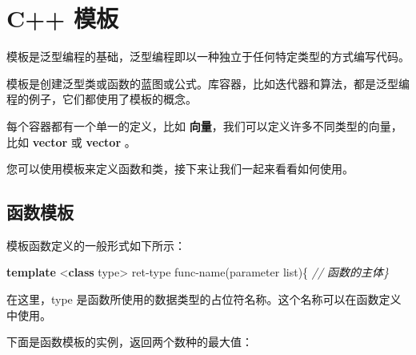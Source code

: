 \documentclass[
]{article}
\newenvironment{Shaded}{}{}
\newcommand{\CommentTok}[1]{\textcolor[rgb]{0.38,0.63,0.69}{\textit{#1}}}
\newcommand{\KeywordTok}[1]{\textcolor[rgb]{0.00,0.44,0.13}{\textbf{#1}}}
\newcommand{\NormalTok}[1]{#1}
\newcommand{\OperatorTok}[1]{\textcolor[rgb]{0.40,0.40,0.40}{#1}}
\begin{document}
\hypertarget{c-ux6a21ux677f}{%
\section{C++ 模板}\label{c-ux6a21ux677f}}

模板是泛型编程的基础，泛型编程即以一种独立于任何特定类型的方式编写代码。

模板是创建泛型类或函数的蓝图或公式。库容器，比如迭代器和算法，都是泛型编程的例子，它们都使用了模板的概念。

每个容器都有一个单一的定义，比如
\textbf{向量}，我们可以定义许多不同类型的向量，比如 \textbf{vector } 或
\textbf{vector }。

您可以使用模板来定义函数和类，接下来让我们一起来看看如何使用。

\hypertarget{ux51fdux6570ux6a21ux677f}{%
\subsection{函数模板}\label{ux51fdux6570ux6a21ux677f}}

模板函数定义的一般形式如下所示：

\begin{Shaded}
\begin{Highlighting}[]
\KeywordTok{template} \OperatorTok{\textless{}}\KeywordTok{class}\NormalTok{ type}\OperatorTok{\textgreater{}}\NormalTok{ ret}\OperatorTok{{-}}\NormalTok{type func}\OperatorTok{{-}}\NormalTok{name}\OperatorTok{(}\NormalTok{parameter list}\OperatorTok{)\{}   \CommentTok{// 函数的主体\}}
\end{Highlighting}
\end{Shaded}

在这里，type
是函数所使用的数据类型的占位符名称。这个名称可以在函数定义中使用。

下面是函数模板的实例，返回两个数种的最大值：
\end{document}
